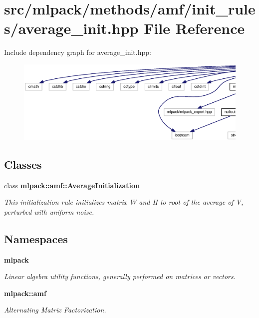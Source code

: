 \section{src/mlpack/methods/amf/init\+\_\+rules/average\+\_\+init.hpp File Reference}
\label{average__init_8hpp}
Include dependency graph for average\+\_\+init.\+hpp\+:
\nopagebreak
\begin{figure}[H]
\begin{center}
\leavevmode
\includegraphics[width=350pt]{average__init_8hpp__incl}
\end{center}
\end{figure}
\subsection*{Classes}
\begin{DoxyCompactItemize}
\item 
class {\bf mlpack\+::amf\+::\+Average\+Initialization}
\begin{DoxyCompactList}\small\item\em This initialization rule initializes matrix W and H to root of the average of V, perturbed with uniform noise. \end{DoxyCompactList}\end{DoxyCompactItemize}
\subsection*{Namespaces}
\begin{DoxyCompactItemize}
\item 
 {\bf mlpack}
\begin{DoxyCompactList}\small\item\em Linear algebra utility functions, generally performed on matrices or vectors. \end{DoxyCompactList}\item 
 {\bf mlpack\+::amf}
\begin{DoxyCompactList}\small\item\em Alternating Matrix Factorization. \end{DoxyCompactList}\end{DoxyCompactItemize}

